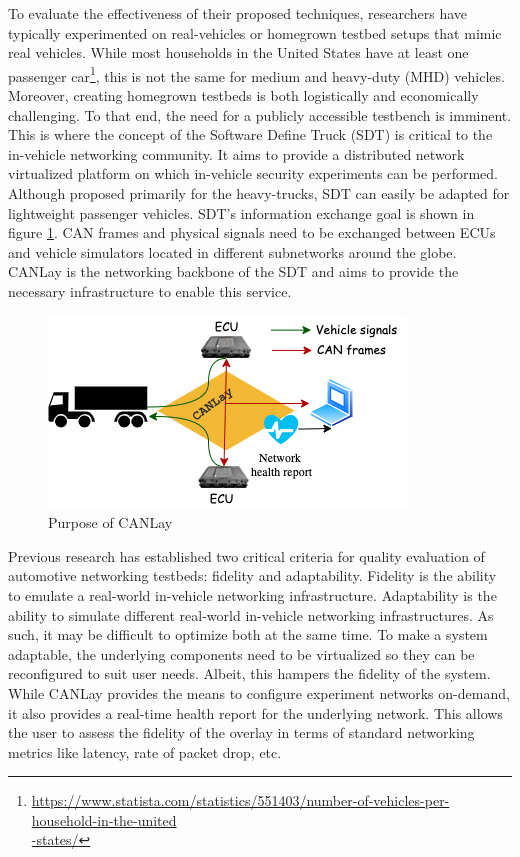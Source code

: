 \documentclass[letterpaper,twocolumn,12pt]{article}
\begin{document}
To evaluate the effectiveness of their proposed techniques, researchers have typically experimented on real-vehicles or homegrown testbed setups that mimic real vehicles. 
While most households in the United States have at least one passenger car\footnote{\url{https://www.statista.com/statistics/551403/number-of-vehicles-per-household-in-the-united}\\\url{-states/}}, this is not the same for medium and heavy-duty (MHD) vehicles. 
Moreover, creating homegrown testbeds is both logistically and economically challenging. To that end, the need for a publicly accessible testbench is imminent. This is where the concept of the Software Define Truck (SDT) \cite{mukherjee_towards_2021} is critical to the in-vehicle networking community. It aims to provide a distributed network virtualized platform on which in-vehicle security experiments can be performed. Although proposed primarily for the heavy-trucks, SDT can easily be adapted for lightweight passenger vehicles. SDT's information exchange goal is shown in figure \ref{fig:goal}. CAN frames and physical signals need to be exchanged between ECUs and vehicle simulators located in different subnetworks around the globe. CANLay is the networking backbone of the SDT and aims to provide the necessary infrastructure to enable this service.

\begin{figure}[]
    \centering
    \includegraphics[width=\linewidth]{images/design_goal.drawio.png}
    \caption{Purpose of CANLay}
    \label{fig:goal}
\end{figure}

Previous research \cite{tagarev_automotive_2021} has established two critical criteria for quality evaluation of automotive networking testbeds: fidelity and adaptability. Fidelity is the ability to emulate a real-world in-vehicle networking infrastructure. Adaptability is the ability to simulate different real-world in-vehicle networking infrastructures. As such, it may be difficult to optimize both at the same time. To make a system adaptable, the underlying components need to be virtualized so they can be reconfigured to suit user needs. Albeit, this hampers the fidelity of the system. While CANLay provides the means to configure experiment networks on-demand, it also provides a real-time health report for the underlying network. This allows the user to assess the fidelity of the overlay in terms of standard networking metrics like latency, rate of packet drop, etc.
\end{document}
